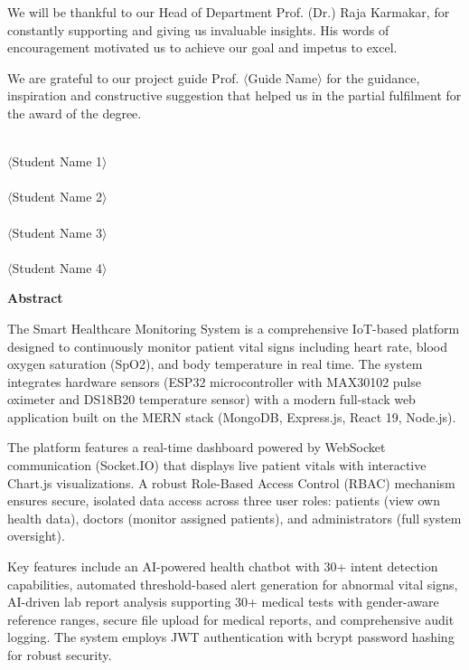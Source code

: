 \documentclass[12pt,a4paper]{report}
\begin{document}
\vspace{0.5cm}
We will be thankful to our Head of Department Prof. (Dr.) Raja Karmakar, for constantly supporting and giving us invaluable insights. His words of encouragement motivated us to achieve our goal and impetus to excel.

\vspace{0.5cm}
We are grateful to our project guide Prof. $\langle$Guide Name$\rangle$ for the guidance, inspiration and constructive suggestion that helped us in the partial fulfilment for the award of the degree.

\vspace{3cm}
\begin{flushright}
\dotfill\\$\langle$Student Name 1$\rangle$\\[1cm]
\dotfill\\$\langle$Student Name 2$\rangle$\\[1cm]
\dotfill\\$\langle$Student Name 3$\rangle$\\[1cm]
\dotfill\\$\langle$Student Name 4$\rangle$
\end{flushright}


\newpage
\thispagestyle{empty}
\begin{center}
{\LARGE\bfseries Abstract\\[1cm]}
\end{center}

The Smart Healthcare Monitoring System is a comprehensive IoT-based platform designed to continuously monitor patient vital signs including heart rate, blood oxygen saturation (SpO2), and body temperature in real time. The system integrates hardware sensors (ESP32 microcontroller with MAX30102 pulse oximeter and DS18B20 temperature sensor) with a modern full-stack web application built on the MERN stack (MongoDB, Express.js, React 19, Node.js).

\vspace{0.4cm}
The platform features a real-time dashboard powered by WebSocket communication (Socket.IO) that displays live patient vitals with interactive Chart.js visualizations. A robust Role-Based Access Control (RBAC) mechanism ensures secure, isolated data access across three user roles: patients (view own health data), doctors (monitor assigned patients), and administrators (full system oversight).

\vspace{0.4cm}
Key features include an AI-powered health chatbot with 30+ intent detection capabilities, automated threshold-based alert generation for abnormal vital signs, AI-driven lab report analysis supporting 30+ medical tests with gender-aware reference ranges, secure file upload for medical reports, and comprehensive audit logging. The system employs JWT authentication with bcrypt password hashing for robust security.
\end{document}
